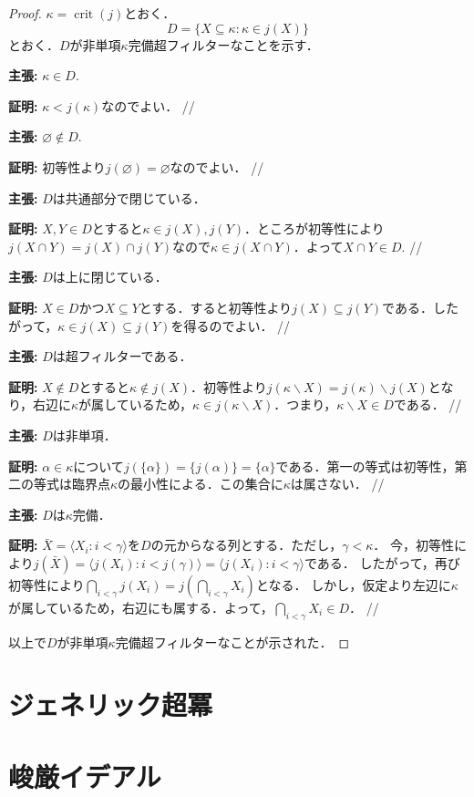 \documentclass[uplatex]{jsarticle}
\newcommand{\crit}{\operatorname{crit}}
\newcommand{\seq}[1]{{\langle#1\rangle}}
\renewcommand\emptyset{\varnothing}
\renewcommand\subset{\subseteq}
\renewcommand{\setminus}{\smallsetminus}
\theoremstyle{definition}
\begin{document}
	\begin{proof}
		$\kappa = \crit(j)$とおく．
		\[
		D = \{ X \subset \kappa : \kappa \in j(X) \}
		\]
		とおく．$D$が非単項$\kappa$完備超フィルターなことを示す．
		
		\par \textbf{主張: } $\kappa \in D$.
		\par \textbf{証明: } $\kappa < j(\kappa)$なのでよい． \hfill //
		
		\par \textbf{主張: } $\emptyset\not \in D$.
		\par \textbf{証明: } 初等性より$j(\emptyset) = \emptyset$なのでよい． \hfill //
		
		\par \textbf{主張: } $D$は共通部分で閉じている．
		\par \textbf{証明: } $X, Y \in D$とすると$\kappa \in j(X), j(Y)$．ところが初等性により$j(X \cap Y) = j(X) \cap j(Y)$なので$\kappa \in j(X \cap Y)$．よって$X \cap Y \in D$. \hfill //
		
		\par \textbf{主張: } $D$は上に閉じている．
		\par \textbf{証明: } $X \in D$かつ$X \subset Y$とする．すると初等性より$j(X) \subset j(Y)$である．したがって，$\kappa \in j(X) \subset j(Y)$を得るのでよい． \hfill //
		
		\par \textbf{主張: } $D$は超フィルターである．
		\par \textbf{証明: } $X \not \in D$とすると$\kappa \not \in j(X)$．初等性より$j(\kappa \setminus X) = j(\kappa) \setminus j(X)$となり，右辺に$\kappa$が属しているため，$\kappa \in j(\kappa \setminus X)$．つまり，$\kappa \setminus X \in D$である． \hfill //
		
		\par \textbf{主張: } $D$は非単項．
		\par \textbf{証明: } 	$\alpha \in \kappa$について$j(\{\alpha\}) = \{j(\alpha)\} = \{\alpha\}$である．第一の等式は初等性，第二の等式は臨界点$\kappa$の最小性による．この集合に$\kappa$は属さない． \hfill //
		
		\par \textbf{主張: } $D$は$\kappa$完備．
		\par \textbf{証明: } 	$\bar{X} = \seq{X_i : i < \gamma }$を$D$の元からなる列とする．ただし，$\gamma < \kappa$．
		今，初等性により$j(\bar{X}) = \seq{j(X_i) : i < j(\gamma)} = \seq{j(X_i) : i < \gamma}$である．
		したがって，再び初等性により$\bigcap_{i < \gamma} j(X_i) = j(\bigcap_{i < \gamma} X_i)$となる．
		しかし，仮定より左辺に$\kappa$が属しているため，右辺にも属する．よって，$\bigcap_{i < \gamma} X_i \in D$． \hfill //
		
		\par 以上で$D$が非単項$\kappa$完備超フィルターなことが示された．
		
	\end{proof}
	
	\section{ジェネリック超冪}
	
	\section{峻厳イデアル}
	
	\nocite{*}
	\printbibliography[title={参考文献}]
	
\end{document}
